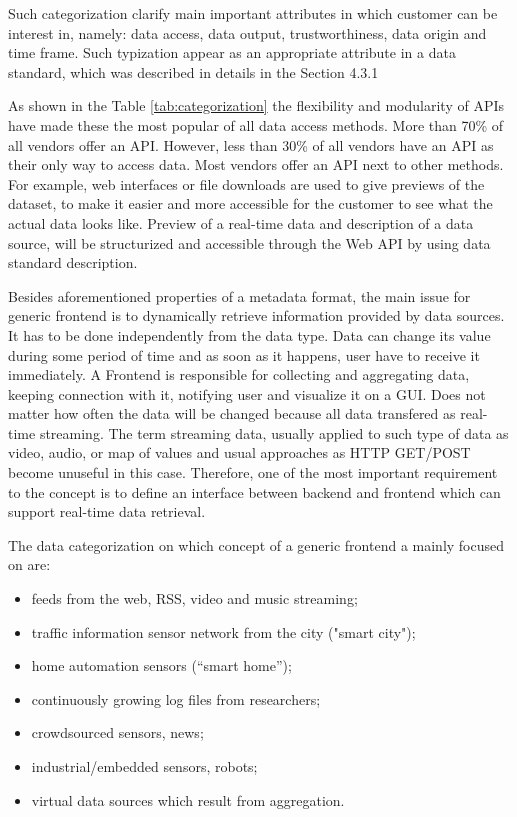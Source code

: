 	Such categorization clarify main important attributes in which customer can be interest in, namely: data access, data output, trustworthiness, data origin and time frame. Such typization appear as an appropriate attribute in a data standard, which was described in details in the Section 4.3.1

	As shown in the Table \ref{tab:categorization} the flexibility and modularity of APIs have made these the most popular of all data access methods. More than 70\% of all vendors offer an API. However, less than 30\% of all vendors have an API as their only way to access data. Most vendors offer an API next to other methods. For example, web interfaces or file downloads are used to give previews of the dataset, to make it easier and more accessible for the customer to see what the actual data looks like. Preview of a real-time data and description of a data source, will be structurized and accessible through the Web API by using data standard description.

	Besides aforementioned properties of a metadata format, the main issue for generic frontend is to dynamically retrieve information provided by data sources. It has to be done independently from the data type. Data can change its value during some period of time and as soon as it happens, user have to receive it immediately. A Frontend is responsible for collecting and aggregating data, keeping connection with it, notifying user and visualize it on a GUI. Does not matter how often the data will be changed because all data transfered as real-time streaming. The term streaming data, usually applied to such type of data as video, audio, or map of values and usual approaches as HTTP GET/POST become unuseful in this case. Therefore, one of the most important requirement to the concept is to define an interface between backend and frontend which can support real-time data retrieval. 

    The data categorization on which concept of a generic frontend a mainly focused on are:
    \begin{itemize}
    \item feeds from the web, RSS, video and music streaming;
    \item traffic information sensor network from the city ("smart city");
    \item home automation sensors (``smart home'');
    \item continuously growing log files from researchers;
    \item crowdsourced sensors, news;
    \item industrial/embedded sensors, robots;
    \item virtual data sources which result from aggregation.
    \end{itemize}

